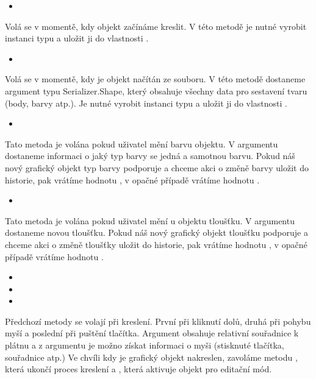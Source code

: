 \documentclass[
  field=inf,
  biblatex=false,
  glossaries,
  index
]{kidiplom}
\begin{document}
\begin{itemize}
\item {}
\end{itemize}
Volá se v momentě, kdy objekt začínáme kreslit. V této metodě je nutné vyrobit instanci typu  a uložit ji do vlastnosti .


\begin{itemize}
\item {}
\end{itemize}
Volá se v momentě, kdy je objekt načítán ze souboru. V této metodě dostaneme argument typu {Serializer.Shape}, který obsahuje všechny data pro sestavení tvaru (body, barvy atp.). Je nutné vyrobit instanci typu  a uložit ji do vlastnosti .


\begin{itemize}
\item {}
\end{itemize}
Tato metoda je volána pokud uživatel mění barvu objektu. V argumentu dostaneme informaci o jaký typ barvy se jedná a samotnou barvu. Pokud náš nový grafický objekt typ barvy podporuje a chceme akci o změně barvy uložit do historie, pak vrátíme hodnotu , v opačné případě vrátíme hodnotu .

\begin{itemize}
\item {}
\end{itemize}
Tato metoda je volána pokud uživatel mění u objektu tloušťku. V argumentu dostaneme novou tloušťku. Pokud náš nový grafický objekt tloušťku podporuje a chceme akci o změně tloušťky uložit do historie, pak vrátíme hodnotu , v opačné případě vrátíme hodnotu .

\begin{itemize}
\item {}
\item {}
\item {}
\end{itemize}
Předchozí metody se volají při kreslení. První při kliknutí dolů, druhá při pohybu myší a poslední při puštění tlačítka. Argument  obsahuje relativní souřadnice k plátnu a z argumentu  je možno získat informaci o myši (stisknuté tlačítka, souřadnice atp.) Ve chvíli kdy je grafický objekt nakreslen, zavoláme metodu , která ukončí proces kreslení a , která aktivuje objekt pro editační mód.
\end{document}

